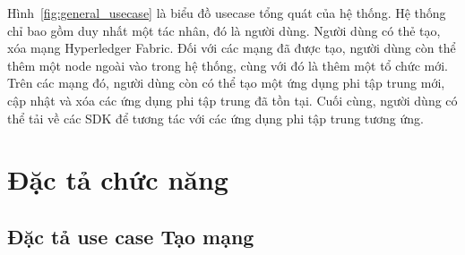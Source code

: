 \documentclass[../DoAn.tex]{subfiles}
\begin{document}
Hình~\ref{fig:general_usecase} là biểu đồ usecase tổng quát của hệ thống. Hệ
thống chỉ bao gồm duy nhất một tác nhân, đó là người dùng. Người dùng có thẻ
tạo, xóa mạng Hyperledger Fabric. Đối với các mạng đã được tạo, người dùng còn
thể thêm một node ngoài vào trong hệ thống, cùng với đó là thêm một tổ chức
mới. Trên các mạng đó, người dùng còn có thể tạo một ứng dụng phi tập trung
mới, cập nhật và xóa các ứng dụng phi tập trung đã tồn tại. Cuối cùng, người
dùng có thể tải về các SDK để tương tác với các ứng dụng phi tập trung tương
ứng.




\section{Đặc tả chức năng}
\label{section:2.3}

\newpage
\subsection{Đặc tả use case Tạo mạng}
\hfill
\end{document}
